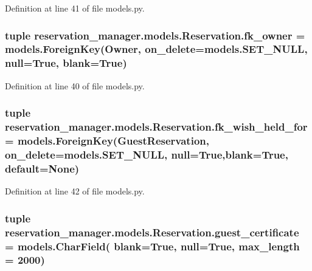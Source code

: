 Definition at line 41 of file models.\-py.

\hypertarget{classreservation__manager_1_1models_1_1Reservation_ad460f0ba3d784f28324085882a2246b8}{
\subsubsection[{fk\-\_\-owner}]{\setlength{\rightskip}{0pt plus 5cm}tuple reservation\-\_\-manager.\-models.\-Reservation.\-fk\-\_\-owner = models.\-Foreign\-Key({\bf Owner}, on\-\_\-delete=models.\-S\-E\-T\-\_\-\-N\-U\-L\-L, null=True, blank=True)\hspace{0.3cm}{\ttfamily [static]}}}\label{classreservation__manager_1_1models_1_1Reservation_ad460f0ba3d784f28324085882a2246b8}


Definition at line 40 of file models.\-py.

\hypertarget{classreservation__manager_1_1models_1_1Reservation_a0fc4a0b1a628c9d2eadbe57632be4387}{
\subsubsection[{fk\-\_\-wish\-\_\-held\-\_\-for}]{\setlength{\rightskip}{0pt plus 5cm}tuple reservation\-\_\-manager.\-models.\-Reservation.\-fk\-\_\-wish\-\_\-held\-\_\-for = models.\-Foreign\-Key({\bf Guest\-Reservation}, on\-\_\-delete=models.\-S\-E\-T\-\_\-\-N\-U\-L\-L, null=True,blank=True, default=None)\hspace{0.3cm}{\ttfamily [static]}}}\label{classreservation__manager_1_1models_1_1Reservation_a0fc4a0b1a628c9d2eadbe57632be4387}


Definition at line 42 of file models.\-py.

\hypertarget{classreservation__manager_1_1models_1_1Reservation_ac844ab7132b06fb3c171707f201bf608}{
\subsubsection[{guest\-\_\-certificate}]{\setlength{\rightskip}{0pt plus 5cm}tuple reservation\-\_\-manager.\-models.\-Reservation.\-guest\-\_\-certificate = models.\-Char\-Field( blank=True, null=True, max\-\_\-length = 2000)\hspace{0.3cm}{\ttfamily [static]}}}\label{classreservation__manager_1_1models_1_1Reservation_ac844ab7132b06fb3c171707f201bf608}


